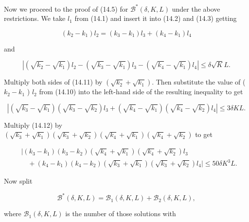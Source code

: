 \documentclass[10pt]{article}
\begin{document}
Now we proceed to the proof of (14.5) for $\mathscr{B}^{*}(\delta, K, L)$ under the above restrictions. We take $l_{1}$ from (14.1) and insert it into (14.2) and (14.3) getting


\begin{equation*}
\left(k_{2}-k_{1}\right) l_{2}=\left(k_{3}-k_{1}\right) l_{3}+\left(k_{4}-k_{1}\right) l_{4} \tag{14.10}
\end{equation*}


and


\begin{equation*}
\left|\left(\sqrt{k_{2}}-\sqrt{k_{1}}\right) l_{2}-\left(\sqrt{k_{3}}-\sqrt{k_{1}}\right) l_{3}-\left(\sqrt{k_{4}}-\sqrt{k_{1}}\right) l_{4}\right| \leqslant \delta \sqrt{K} L . \tag{14.11}
\end{equation*}


Multiply both sides of (14.11) by $\left(\sqrt{k_{2}}+\sqrt{k_{1}}\right)$. Then substitute the value of ( $k_{2}-k_{1}$ ) $l_{2}$ from (14.10) into the left-hand side of the resulting inequality to get


\begin{equation*}
\left|\left(\sqrt{k_{3}}-\sqrt{k_{1}}\right)\left(\sqrt{k_{3}}-\sqrt{k_{2}}\right) l_{3}+\left(\sqrt{k_{4}}-\sqrt{k_{1}}\right)\left(\sqrt{k_{4}}-\sqrt{k_{2}}\right) l_{4}\right| \leqslant 3 \delta K L . \tag{14.12}
\end{equation*}


Multiply (14.12) by $\left(\sqrt{k_{3}}+\sqrt{k_{1}}\right)\left(\sqrt{k_{3}}+\sqrt{k_{2}}\right)\left(\sqrt{k_{4}}+\sqrt{k_{1}}\right)\left(\sqrt{k_{4}}+\sqrt{k_{2}}\right)$ to get


\begin{align*}
& \mid\left(k_{3}-k_{1}\right)\left(k_{3}-k_{2}\right)\left(\sqrt{k_{4}}+\sqrt{k_{1}}\right)\left(\sqrt{k_{4}}+\sqrt{k_{2}}\right) l_{3} \\
& \quad+\left(k_{4}-k_{1}\right)\left(k_{4}-k_{2}\right)\left(\sqrt{k_{3}}+\sqrt{k_{1}}\right)\left(\sqrt{k_{3}}+\sqrt{k_{2}}\right) l_{4} \mid \leqslant 50 \delta K^{3} L . \tag{14.13}
\end{align*}


Now split


\begin{equation*}
\mathscr{B}^{*}(\delta, K, L)=\mathscr{B}_{1}(\delta, K, L)+\mathscr{B}_{2}(\delta, K, L), \tag{14.14}
\end{equation*}


where $\mathscr{B}_{1}(\delta, K, L)$ is the number of those solutions with
\end{document}
